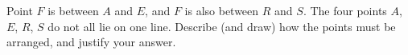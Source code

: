 Point $F$ is between $A$ and $E$, and $F$ is also between $R$ and $S$. The four points $A$, $E$, $R$, $S$ do not all lie on one line. Describe (and draw) how the points must be arranged, and justify your answer.

